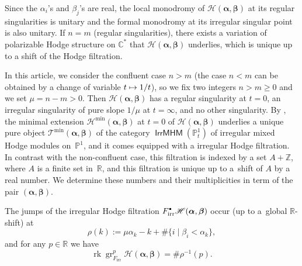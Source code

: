 \documentclass[11pt]{article}
\let\mathcal\mathscr
\newenvironment{theoreme*}{\paragraph{Theorem.}\em}{\rm}
\def\cH{\mathcal{H}}
\def\cT{\mathcal{T}}
\def\CC{\mathbb{C}}
\def\PP{\mathbb{P}}
\def\RR{\mathbb{R}}
\def\ZZ{\mathbb{Z}}
\def\alphag{\boldsymbol{\alpha}}
\def\betag{\boldsymbol{\beta}}
\newcommand{\bbullet}{{\scriptscriptstyle\bullet}}
\newcommand{\cbbullet}{{\raisebox{1pt}{$\bbullet$}}}
\let\geq\geqslant
\newcommand{\irr}{{\mathrm{irr}}}
\DeclareMathOperator{\gr}{gr}
\DeclareMathOperator{\rk}{rk}
\DeclareMathOperator{\IrrMHM}{\mathsf{IrrMHM}}
\def\mto{\mathchoice{\longmapsto}{\mapsto}{\mapsto}{\mapsto}}
\begin{document}
Since the $\alpha_i$'s and $\beta_j$'s are real, the local monodromy of $\cH(\alphag,\betag)$ at its regular singularities is unitary and the formal monodromy at its irregular singular point is also unitary. If $n=m$ (regular singularities), there exists a variation of polarizable Hodge structure on $\CC^*$ that $\cH(\alphag,\betag)$ underlies, which is unique up to a shift of the Hodge filtration.

In this article, we consider the confluent case $n>m$ (the case $n<m$ can be obtained by a change of variable $t\mto1/t$), so we fix two integers $n>m\geq0$ and we set $\mu=n-m>0$. Then $\cH(\alphag,\betag)$ has a regular singularity at $t=0$, an irregular singularity of pure slope $1/\mu$ at $t=\infty$, and no other singularity. By \cite[Th.\,0.7]{Bibi15}, the minimal extension $\cH^{\min}(\alphag,\betag)$ at $t=0$ of $\cH(\alphag,\betag)$ underlies a unique pure object $\cT^{\min}(\alphag,\betag)$ of the category $\IrrMHM(\PP^1_t)$ of irregular mixed Hodge modules on~$\PP^1$, and it comes equipped with a irregular Hodge filtration. In contrast with the non-confluent case, this filtration is indexed by a set $A+\ZZ$, where $A$ is a finite set in~$\RR$, and this filtration is unique up to a~shift of $A$ by a real number. We determine these numbers and their multiplicities in term of the pair $(\alphag,\betag)$.

\begin{theoreme*}
The jumps of the irregular Hodge filtration $F^\cbbullet_\irr\cH(\alphag,\betag)$ occur (up to a~global $\RR$-shift) at
\begin{equation}\label{eq:hypergeomstar}
\rho(k):=\mu\alpha_k-k+\#\{i\mid\beta_i<\alpha_k\},
\end{equation}
and for any $p\in\RR$ we have
\begin{equation}\label{eq:hypergeomstarstar}
\rk\gr^p_{F_\irr}\cH(\alphag,\betag)=\#\rho^{-1}(p).
\end{equation}
\end{theoreme*}
\end{document}
